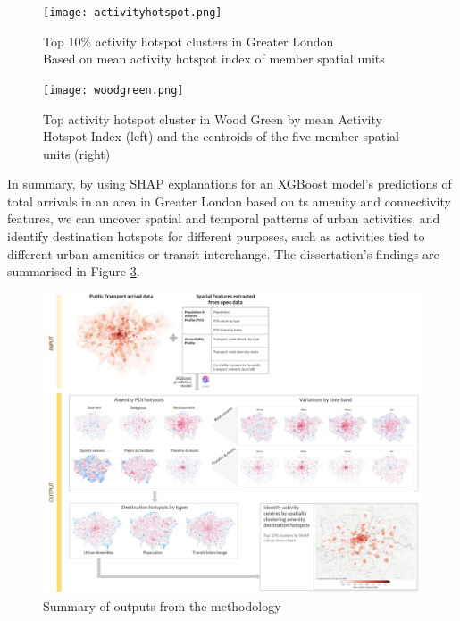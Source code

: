 \begin{figure}
    \centering
    \texttt{[image: activityhotspot.png]}
    \captionsetup{justification=centering}
    \caption{Top 10\% activity hotspot clusters in Greater London\\Based on mean activity hotspot index of member spatial units}
    \label{fig:activityhotpost}
\end{figure}

\begin{figure}[!hbt]
    \centering
    \texttt{[image: woodgreen.png]}
    \captionsetup{justification=centering}
    \caption{Top activity hotspot cluster in Wood Green by mean Activity Hotspot Index (left) and the centroids of the five member spatial units (right)}
    \label{fig:woodgreen}
\end{figure}

In summary, by using SHAP explanations for an XGBoost model's predictions of total arrivals in an area in Greater London based on ts amenity and connectivity features, we can uncover spatial and temporal patterns of urban activities, and identify destination hotspots for different purposes, such as activities tied to different urban amenities or transit interchange. The dissertation's findings are summarised in Figure \ref{fig:summary}.

\begin{figure}[!hbt]
    \centering
    \includegraphics[width=\textwidth]{summary.png}
    \captionsetup{justification=centering}
    \caption{Summary of outputs from the methodology}
    \label{fig:summary}
\end{figure}

